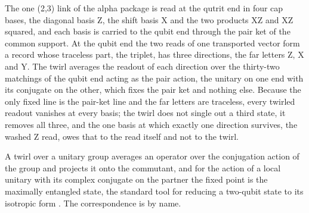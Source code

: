 The one (2,3) link of the alpha package is read at the qutrit end in four cap bases, the diagonal basis Z, the shift basis X and the two products XZ and XZ squared, and each basis is carried to the qubit end through the pair ket of the common support. At the qubit end the two reads of one transported vector form a record whose traceless part, the triplet, has three directions, the far letters Z, X and Y. The twirl averages the readout of each direction over the thirty-two matchings of the qubit end acting as the pair action, the unitary on one end with its conjugate on the other, which fixes the pair ket and nothing else. Because the only fixed line is the pair-ket line and the far letters are traceless, every twirled readout vanishes at every basis; the twirl does not single out a third state, it removes all three, and the one basis at which exactly one direction survives, the washed Z read, owes that to the read itself and not to the twirl.
\begin{chbridge}
A twirl over a unitary group averages an operator over the conjugation action of the group and projects it onto the commutant, and for the action of a local unitary with its complex conjugate on the partner the fixed point is the maximally entangled state, the standard tool for reducing a two-qubit state to its isotropic form \cite{Horodecki1999,Nielsen2000}. The correspondence is by name.
\end{chbridge}

